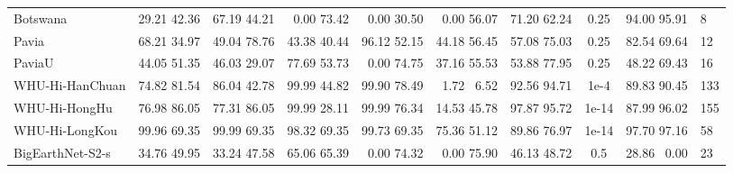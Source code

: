 \begin{frame}
\begin{table}[htbp]
{\begin{tabular}{lccccccccl}
    Botswana& {\color{mycolor1} 29.21} {\color{mycolor2} 42.36}& {\color{mycolor1} 67.19} {\color{mycolor2} 44.21}& {\color{mycolor1} ~0.00} {\color{mycolor2} 73.42}& {\color{mycolor1} ~0.00} {\color{mycolor2} 30.50}& {\color{mycolor1} ~0.00} {\color{mycolor2} 56.07}& {\color{mycolor1} 71.20} {\color{mycolor2} 62.24}&0.25 &{\color{mycolor1} 94.00} {\color{mycolor2} 95.91}&8\\
    Pavia & {\color{mycolor1} 68.21} {\color{mycolor2} 34.97}& {\color{mycolor1} 49.04} {\color{mycolor2} 78.76} & {\color{mycolor1} 43.38} {\color{mycolor2} 40.44}& {\color{mycolor1} 96.12} {\color{mycolor2} 52.15}& {\color{mycolor1} 44.18} {\color{mycolor2} 56.45}& {\color{mycolor1} 57.08} {\color{mycolor2} 75.03}  &0.25 &{\color{mycolor1} 82.54} {\color{mycolor2} 69.64}&12\\
    PaviaU & {\color{mycolor1} 44.05} {\color{mycolor2} 51.35} & {\color{mycolor1} 46.03} {\color{mycolor2} 29.07} & {\color{mycolor1} 77.69} {\color{mycolor2} 53.73}& {\color{mycolor1} ~0.00} {\color{mycolor2} 74.75}& {\color{mycolor1} 37.16} {\color{mycolor2} 55.53}& {\color{mycolor1} 53.88} {\color{mycolor2} 77.95}&0.25&{\color{mycolor1} 48.22} {\color{mycolor2} 69.43}&16\\
    WHU-Hi-HanChuan & {\color{mycolor1} 74.82} {\color{mycolor2} 81.54}& {\color{mycolor1} 86.04} {\color{mycolor2} 42.78} & {\color{mycolor1} 99.99} {\color{mycolor2} 44.82}& {\color{mycolor1} 99.90} {\color{mycolor2} 78.49}& {\color{mycolor1} ~1.72} {\color{mycolor2} ~6.52}& {\color{mycolor1} 92.56} {\color{mycolor2} 94.71} &1e-4 &{\color{mycolor1} 89.83} {\color{mycolor2} 90.45}&133\\
    WHU-Hi-HongHu & {\color{mycolor1} 76.98} {\color{mycolor2} 86.05}& {\color{mycolor1} 77.31} {\color{mycolor2} 86.05} & {\color{mycolor1} 99.99} {\color{mycolor2} 28.11}& {\color{mycolor1} 99.99} {\color{mycolor2} 76.34}& {\color{mycolor1} 14.53} {\color{mycolor2} 45.78}& {\color{mycolor1} 97.87} {\color{mycolor2} 95.72}&1e-14 &{\color{mycolor1} 87.99} {\color{mycolor2} 96.02}&155\\
    WHU-Hi-LongKou & {\color{mycolor1} 99.96} {\color{mycolor2} 69.35}& {\color{mycolor1} 99.99} {\color{mycolor2} 69.35} & {\color{mycolor1} 98.32} {\color{mycolor2} 69.35}& {\color{mycolor1} 99.73} {\color{mycolor2} 69.35}& {\color{mycolor1} 75.36} {\color{mycolor2} 51.12}& {\color{mycolor1} 89.86} {\color{mycolor2} 76.97}  &1e-14 &{\color{mycolor1} 97.70} {\color{mycolor2} 97.16}&58\\
    BigEarthNet-S2-s& {\color{mycolor1} 34.76} {\color{mycolor2} 49.95}& {\color{mycolor1} 33.24} {\color{mycolor2} 47.58}& {\color{mycolor1} 65.06} {\color{mycolor2} 65.39}& {\color{mycolor1} ~0.00} {\color{mycolor2} 74.32}& {\color{mycolor1} ~0.00} {\color{mycolor2} 75.90}& {\color{mycolor1} 46.13} {\color{mycolor2} 48.72}&0.5 &{\color{mycolor1} 28.86} {\color{mycolor2} ~0.00}&23\\

\end{tabular}}
\end{table}
\end{frame}
